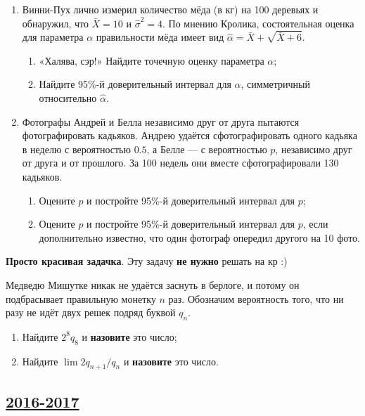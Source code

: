 \begin{enumerate}
\item Винни-Пух лично измерил количество мёда (в кг) на 100 деревьях и обнаружил, что $\bar X = 10$ и $\hat\sigma^2 = 4$.
По мнению Кролика, состоятельная оценка для параметра $\alpha$ правильности мёда имеет вид $\hat \alpha = \bar X + \sqrt{\bar X + 6}$.

\begin{enumerate}
\item «Халява, сэр!» Найдите точечную оценку параметра $\alpha$;
\item Найдите 95\%-й доверительный интервал для $\alpha$, симметричный относительно
$\hat\alpha$.
\end{enumerate}

\item Фотографы Андрей и Белла независимо друг от друга пытаются фотографировать кадьяков.
Андрею удаётся сфотографировать одного кадьяка в неделю с вероятностью $0.5$, а Белле — с вероятностью $p$,
независимо друг от друга и от прошлого.
За 100 недель они вместе сфотографировали 130 кадьяков.

\begin{enumerate}
\item Оцените $p$ и постройте 95\%-й доверительный интервал для $p$;
\item Оцените $p$ и постройте 95\%-й доверительный интервал для $p$,
если дополнительно известно, что один фотограф опередил другого на 10 фото.
\end{enumerate}
\end{enumerate}

\textbf{Просто красивая задачка}. Эту задачу \textbf{не нужно} решать на кр :)

Медведю Мишутке никак не удаётся заснуть в берлоге, и потому он подбрасывает
правильную монетку $n$ раз.
Обозначим вероятность того, что ни разу не идёт двух решек подряд буквой $q_n$.

\begin{enumerate}[label=\asbuk*)]
\item Найдите $2^8q_8$ и \textbf{назовите} это число;
\item Найдите $\lim 2q_{n+1}/q_n$ и \textbf{назовите} это число.
\end{enumerate}


\newpage
\subsection[2016-2017]{\hyperref[sec:sol_kr_03_ip_2016_2017]{2016-2017}}
\label{sec:kr_03_ip_2016_2017}

